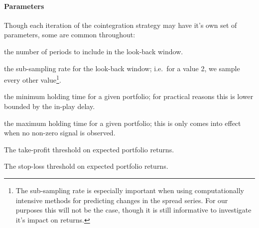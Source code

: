 \paragraph{Parameters}
Though each iteration of the cointegration strategy may have it's own set of
parameters, some are common throughout:
\begin{description}[leftmargin=!, labelwidth=2em]
    \item[\texttt{LB}] the number of periods to include in the
        look-back window.
    \item[\texttt{SS}] the sub-sampling rate for the look-back
        window; i.e.\ for a value 2, we sample every other value\footnote{The
            sub-sampling rate is especially important when using
            computationally intensive methods for predicting changes in the
            spread series. For our purposes this will not be the case, though
        it is still informative to investigate it's impact on returns.}.
    \item[$\underbar{$t$}$] the minimum holding time for a given portfolio;
        for practical reasons this is lower bounded by the in-play delay.
    \item[$T$] the maximum holding time for a given portfolio; this is only
        comes into effect when no non-zero signal is observed.
    \item[$r_\text{TP}$] The take-profit threshold on expected portfolio
        returns.
    \item[$r_\text{SL}$] The stop-loss threshold on expected portfolio
        returns.
\end{description}


